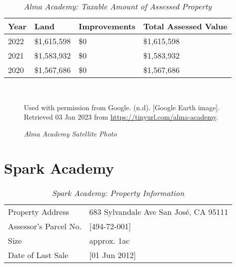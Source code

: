\begin{table}[hbtp]
  \SingleSpacing%
  \caption[Alma Academy: Taxable Amount of Assessed Propery]{\textit{Alma Academy: Taxable Amount of Assessed Property}}%
  \label{tab:alma-academy-taxable-amount}
  \begin{tabular}{llll}
    \toprule
    Year & Land        & Improvements & Total Assessed Value \\
    \midrule
    2022 & \$1,615,598 & \$0          & \$1,615,598 \\
    2021 & \$1,583,932 & \$0          & \$1,583,932 \\
    2020 & \$1,567,686 & \$0          & \$1,567,686 \\
    \bottomrule
  \end{tabular}\\\newline
\end{table}

\begin{figure}[hbtp]
    \caption[Alma Academy Satellite Photo]{\textit{Alma Academy Satellite Photo}}%
    \label{fig:alma-academy-sat-photo}
    {Used with permission from Google. (n.d). [Google Earth image]. Retrieved 03 Jan 2023 from \url{https://tinyurl.com/alma-academy}.}
\end{figure}


\clearpage
\section{Spark Academy}\label{sec:spark-academy-info}\indent

\begin{table}[htbp]
  \SingleSpacing%
  \caption[Spark Academy: Property Information]{\textit{Spark Academy: Property Information}}%
  \label{tab:spark-academy-prop-info}
  \begin{tabular}{ll}
    \toprule
    Property Address      & 683 Sylvandale Ave San José, CA 95111 \\
    Assessor's Parcel No. & [494-72-001] \\
    Size                  & approx. 1ac \\
    Date of Last Sale     & [01 Jun 2012]\\
    \bottomrule
  \end{tabular}\\
\end{table}

